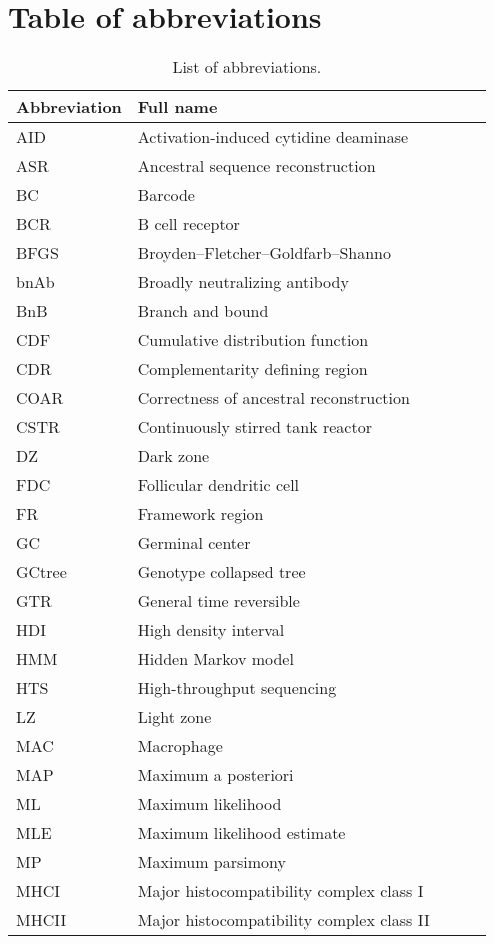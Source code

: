 \chapter{Table of abbreviations}

\begin{table}[!ht]
\begin{tabular}{l*{3}{l}r}
	 \textbf{Abbreviation} & \textbf{Full name} \\
	\hline
	AID & Activation-induced cytidine deaminase \\
	ASR & Ancestral sequence reconstruction \\
	BC & Barcode \\
	BCR & B cell receptor \\
	BFGS & Broyden–Fletcher–Goldfarb–Shanno \\
	bnAb & Broadly neutralizing antibody \\
	BnB & Branch and bound \\
	CDF & Cumulative distribution function \\
	CDR & Complementarity defining region \\
	COAR & Correctness of ancestral reconstruction \\
	CSTR & Continuously stirred tank reactor \\
	DZ & Dark zone \\
	FDC & Follicular dendritic cell \\
	FR & Framework region \\
	GC & Germinal center \\
	GCtree & Genotype collapsed tree \\
	GTR & General time reversible \\
	HDI & High density interval \\
	HMM & Hidden Markov model \\
	HTS & High-throughput sequencing \\
    LZ & Light zone \\
	MAC & Macrophage \\
	MAP & Maximum a posteriori \\
	ML & Maximum likelihood \\
	MLE & Maximum likelihood estimate \\
	MP & Maximum parsimony \\
	MHCI & Major histocompatibility complex class I \\
	MHCII & Major histocompatibility complex class II \\
	\hline
\end{tabular}
\caption{List of abbreviations.}
\end{table}

